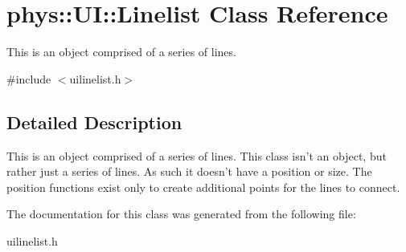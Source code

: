 \hypertarget{classphys_1_1UI_1_1Linelist}{
\section{phys::UI::Linelist Class Reference}
\label{da/da3/classphys_1_1UI_1_1Linelist}
}


This is an object comprised of a series of lines.  




{\ttfamily \#include $<$uilinelist.h$>$}



\subsection{Detailed Description}
This is an object comprised of a series of lines. This class isn't an object, but rather just a series of lines. As such it doesn't have a position or size. The position functions exist only to create additional points for the lines to connect. 

The documentation for this class was generated from the following file:\begin{DoxyCompactItemize}
\item 
uilinelist.h\end{DoxyCompactItemize}
